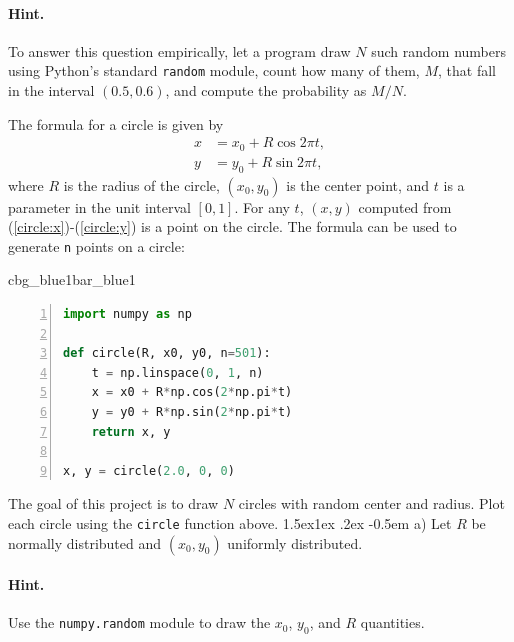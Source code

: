 \documentclass[%
oneside,                 %
final,                   %
10pt]{article}
\makeatletter
\newenvironment{_pro_tight}[2]{
   \def\FrameCommand{\color{#2}\vrule width 1mm\normalcolor\colorbox{#1}}
   \FrameRule0.6pt\MakeFramed {\advance\hsize-2mm\FrameRestore}\vskip3mm}
   {\vskip0mm\endMakeFramed}
\newenvironment{pro}[2]{
\bgroup\rmfamily
\fboxsep=0mm\relax
\begin{_pro_tight}{#1}{#2}
\list{}{\parsep=-2mm\parskip=0mm\topsep=0pt\leftmargin=2mm
\rightmargin=2\leftmargin\leftmargin=4pt\relax}
\item\relax}
{\endlist\end{_pro_tight}\egroup}
\newenvironment{doconceexercise}{}{}
\newcounter{doconceexercisecounter}
\newcommand\subex{\@startsection{paragraph}{4}{\z@}%
                  {1.5ex\@plus1ex \@minus.2ex}%
                  {-0.5em}%
                  {\normalfont\normalsize\bfseries}}
\theoremstyle{definition}
\makeatother
\begin{document}
\begin{enumerate}
\begin{doconceexercise}
\paragraph{Hint.}
To answer this question empirically, let a program
draw $N$ such random numbers using Python's standard \texttt{random} module,
count how many of them, $M$, that fall in the interval $(0.5,0.6)$, and
compute the probability as $M/N$.
\end{doconceexercise}
\begin{doconceexercise}
                             
\label{proj:circle1}
The formula for a circle is given by
\begin{align}
x &= x_0 + R\cos 2\pi t,
\label{circle:x}\\ 
y &= y_0 + R\sin 2\pi t,
\label{circle:y}
\end{align}
where $R$ is the radius of the circle, $(x_0,y_0)$ is the
center point, and $t$ is a parameter in the unit interval $[0,1]$.
For any $t$, $(x,y)$ computed from (\ref{circle:x})-(\ref{circle:y})
is a point on the circle.
The formula can be used to generate \texttt{n} points on a circle:
\begin{pro}{cbg_blue1}{bar_blue1}\begin{lstlisting}[language=Python,style=myspeciallststyle,numbers=left,numberstyle=\tiny,stepnumber=3,numbersep=15pt,xleftmargin=1mm]
import numpy as np

def circle(R, x0, y0, n=501):
    t = np.linspace(0, 1, n)
    x = x0 + R*np.cos(2*np.pi*t)
    y = y0 + R*np.sin(2*np.pi*t)
    return x, y

x, y = circle(2.0, 0, 0)

\end{lstlisting}\end{pro}
\noindent

The goal of this project is to draw $N$ circles with random
center and radius. Plot each circle using the \texttt{circle} function
above.
\subex{a)}
Let $R$ be normally distributed and $(x_0,y_0)$ uniformly distributed.
\paragraph{Hint.}
Use the \texttt{numpy.random} module to draw the
$x_0$, $y_0$, and $R$ quantities.

\end{doconceexercise}
\end{enumerate}
\end{document}
